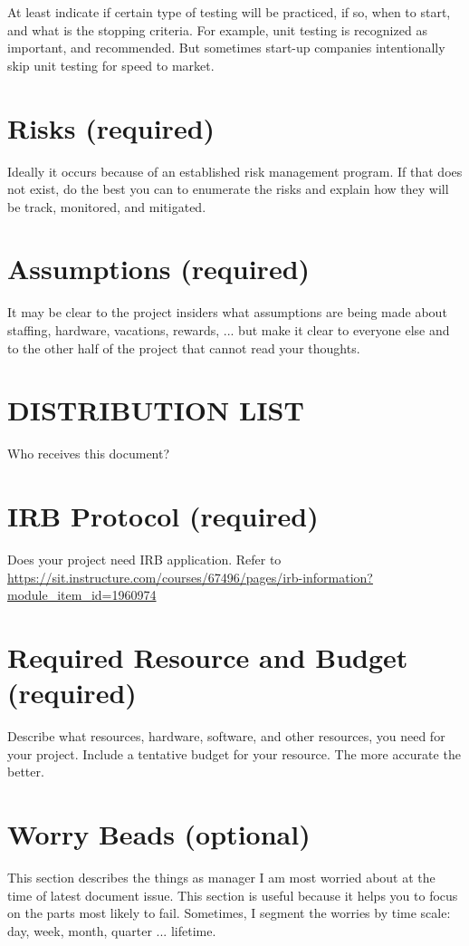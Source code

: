 At least indicate if certain type of testing will be practiced, if so, when to start, and what is the stopping criteria. For example, unit testing is recognized as important, and recommended. But sometimes start-up companies intentionally skip unit testing for speed to market.

\section{Risks (required)}
Ideally it occurs because of an established risk management program.  If that does not exist, do the best you can to enumerate the risks and explain how they will be track, monitored, and mitigated.

\section{Assumptions (required)}
It may be clear to the project insiders what assumptions are being made about staffing, hardware, vacations, rewards, ... but make it clear to everyone else and to the other half of the project that cannot read your thoughts.

\section{DISTRIBUTION LIST}
 
Who receives this document?

\section{IRB Protocol (required)}
Does your project need IRB application. 
Refer to \\
\url{https://sit.instructure.com/courses/67496/pages/irb-information?module_item_id=1960974}


\section{Required Resource and Budget (required)}

Describe what resources, hardware, software, and other resources, you need for your project. Include a tentative budget for your resource. The more accurate the better.

\section{Worry Beads (optional)}  
This section describes the things as manager I am most worried about at the time of latest document issue.  This section is useful because it helps you to focus on the parts most likely to fail.  Sometimes, I segment the worries by time scale: day, week, month, 
quarter ... lifetime. 

